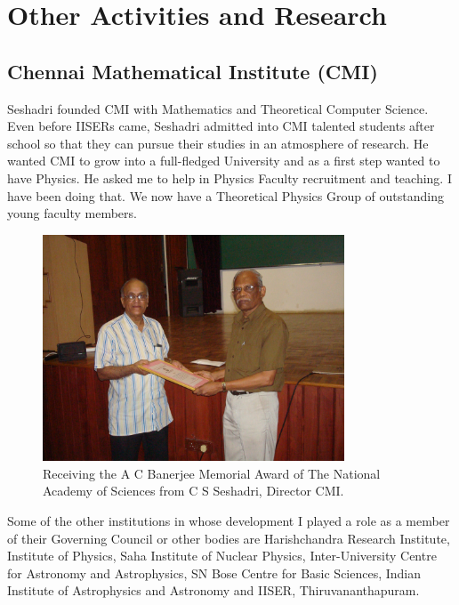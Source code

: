 \chapter{Other Activities and Research}

\section*{Chennai Mathematical Institute (CMI)}

Seshadri founded CMI with Mathematics and Theoretical Computer Science. 
Even before IISERs came, Seshadri admitted into CMI talented students 
after school so that they can pursue their studies in an atmosphere of 
research. He wanted CMI to grow into a full-fledged University and as a 
first step wanted to have Physics. He asked me to help in Physics 
Faculty recruitment and teaching. I have been doing that. We now have a 
Theoretical Physics Group of outstanding young faculty members.

\begin{figure}[h]
\centering
\includegraphics[width=0.8\textwidth]{images/Rajaji-seshadri.jpg}
\caption{\small{Receiving the A C Banerjee Memorial Award of The National\- Academy of Sciences from C S Seshadri, Director CMI.}}
\end{figure}

Some of the other institutions in whose development I pla\-yed a role as a 
member of their Governing Council or other bo\-dies are Harishchandra 
Research Institute, Institute of Physics, Saha Institute of Nuclear 
Physics, Inter-University Centre for Astro\-nomy and Astrophysics, SN Bose 
Centre for Basic Sciences, Indian Institute of Astrophysics and 
Astronomy and IISER, Thiruvananthapuram.

\vspace{-.5cm}

